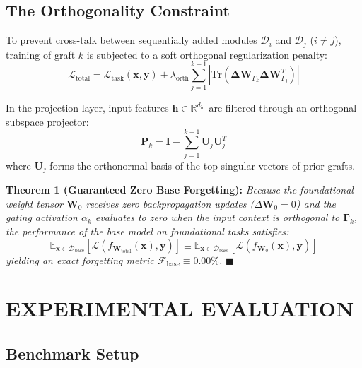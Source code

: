 \documentclass[10pt,twocolumn]{article}
\begin{document}
\subsection{The Orthogonality Constraint}

To prevent cross-talk between sequentially added modules $\mathcal{D}_i$ and $\mathcal{D}_j$ ($i \ne j$), training of graft $k$ is subjected to a soft orthogonal regularization penalty:
\begin{equation}
  \mathcal{L}_{\text{total}} = \mathcal{L}_{\text{task}}(\mathbf{x}, \mathbf{y}) + \lambda_{\text{orth}} \sum_{j=1}^{k-1} \left| \text{Tr} \left( \mathbf{\Delta W}_{\Gamma_k} \mathbf{\Delta W}_{\Gamma_j}^T \right) \right|
\end{equation}

In the projection layer, input features $\mathbf{h} \in \mathbb{R}^{d_{\text{in}}}$ are filtered through an orthogonal subspace projector:
\begin{equation}
  \mathbf{P}_k = \mathbf{I} - \sum_{j=1}^{k-1} \mathbf{U}_j \mathbf{U}_j^T
\end{equation}
where $\mathbf{U}_j$ forms the orthonormal basis of the top singular vectors of prior grafts.

\textbf{Theorem 1 (Guaranteed Zero Base Forgetting):}  
\textit{Because the foundational weight tensor $\mathbf{W}_0$ receives zero backpropagation updates ($\Delta \mathbf{W}_0 = 0$) and the gating activation $\alpha_k$ evaluates to zero when the input context is orthogonal to $\mathbf{\Gamma}_k$, the performance of the base model on foundational tasks satisfies:}
\begin{equation}
  \mathbb{E}_{\mathbf{x} \in \mathcal{D}_{\text{base}}} [ \mathcal{L}(f_{\mathbf{W}_{\text{total}}}(\mathbf{x}), \mathbf{y}) ] \equiv \mathbb{E}_{\mathbf{x} \in \mathcal{D}_{\text{base}}} [ \mathcal{L}(f_{\mathbf{W}_0}(\mathbf{x}), \mathbf{y}) ]
\end{equation}
\textit{yielding an exact forgetting metric $\mathcal{F}_{\text{base}} \equiv 0.00\%$.} $\blacksquare$



\section{EXPERIMENTAL EVALUATION}


\subsection{Benchmark Setup}
\end{document}
